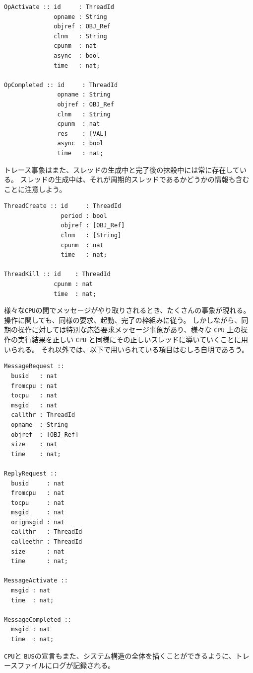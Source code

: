 \documentclass[\pformat,12pt]{jreport}
\begin{document}
\begin{lstlisting}
OpActivate :: id     : ThreadId
              opname : String
              objref : OBJ_Ref
              clnm   : String
              cpunm  : nat
              async  : bool
              time   : nat;

OpCompleted :: id     : ThreadId
               opname : String
               objref : OBJ_Ref
               clnm   : String
               cpunm  : nat
               res    : [VAL]
               async  : bool
               time   : nat;
\end{lstlisting}

トレース事象はまた、スレッドの生成中と完了後の抹殺中には常に存在している。
スレッドの生成中は、それが周期的スレッドであるかどうかの情報も含むことに注意しよう。

\begin{lstlisting}
ThreadCreate :: id     : ThreadId
                period : bool
                objref : [OBJ_Ref]
                clnm   : [String] 
                cpunm  : nat
                time   : nat;

ThreadKill :: id    : ThreadId
              cpunm : nat
              time  : nat;
\end{lstlisting}

様々な\texttt{CPU}の間でメッセージがやり取りされるとき、たくさんの事象が現れる。操作に関しても、同様の要求、起動、完了の枠組みに従う。
しかしながら、同期の操作に対しては特別な応答要求メッセージ事象があり、様々な \texttt{CPU} 上の操作の実行結果を正しい \texttt{CPU} と同様にその正しいスレッドに導いていくことに用いられる。
それ以外では、以下で用いられている項目はむしろ自明であろう。

\begin{lstlisting}
MessageRequest ::
  busid   : nat
  fromcpu : nat
  tocpu   : nat
  msgid   : nat
  callthr : ThreadId
  opname  : String
  objref  : [OBJ_Ref]
  size    : nat
  time    : nat;

ReplyRequest ::
  busid     : nat
  fromcpu   : nat
  tocpu     : nat
  msgid     : nat
  origmsgid : nat
  callthr   : ThreadId
  calleethr : ThreadId
  size      : nat
  time      : nat;

MessageActivate ::
  msgid : nat
  time  : nat;

MessageCompleted ::
  msgid : nat
  time  : nat;
\end{lstlisting}

\texttt{CPU}と \texttt{BUS}の宣言もまた、システム構造の全体を描くことができるように、トレースファイルにログが記録される。
\end{document}

